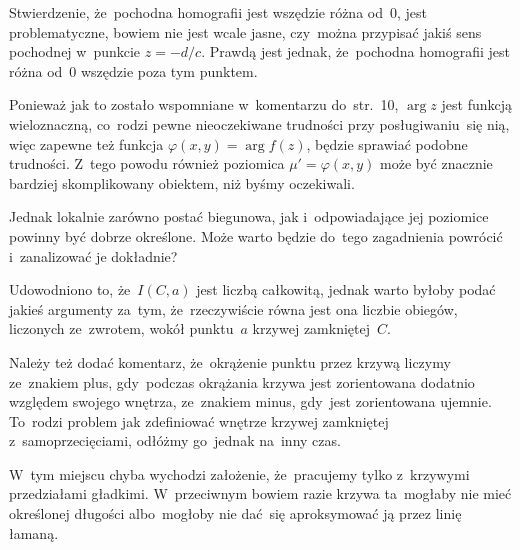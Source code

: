 \documentclass[a4paper,11pt]{article}
\begin{document}
\vspace{\spaceFour}





\noindent
{} Stwierdzenie, że~pochodna homografii jest wszędzie różna od~0,
jest problematyczne, bowiem nie jest wcale jasne, czy~można przypisać
jakiś sens pochodnej w~punkcie $z = -d / c$. Prawdą jest jednak,
że~pochodna homografii jest różna od~0 wszędzie poza tym punktem.

\vspace{\spaceFour}





\noindent
{} Ponieważ jak to zostało wspomniane w~komentarzu do~str.~10,
$\arg z$ jest funkcją wieloznaczną, co~rodzi pewne nieoczekiwane trudności
przy posługiwaniu~się nią, więc zapewne też funkcja
$\varphi( x, y ) = \arg f( z )$, będzie sprawiać podobne trudności. Z~tego powodu
również poziomica $\mu' = \varphi( x, y )$ może być znacznie bardziej skomplikowany
obiektem, niż byśmy oczekiwali.

Jednak lokalnie zarówno postać biegunowa, jak i~odpowiadające jej
poziomice powinny być dobrze określone. Może warto będzie do~tego
zagadnienia powrócić i~zanalizować je dokładnie?

\vspace{\spaceFour}





\noindent
{} Udowodniono to, że~$I( C, a )$ jest liczbą całkowitą, jednak
warto byłoby podać jakieś argumenty za~tym, że~rzeczywiście równa jest ona
liczbie obiegów, liczonych ze~zwrotem, wokół punktu~$a$ krzywej
zamkniętej~$C$.

Należy też dodać komentarz, że~okrążenie punktu przez krzywą liczymy
ze~znakiem plus, gdy~podczas okrążania krzywa jest zorientowana
dodatnio względem swojego wnętrza, ze~znakiem minus, gdy~jest
zorientowana ujemnie. To~rodzi problem jak zdefiniować wnętrze
krzywej zamkniętej z~samoprzecięciami, odłóżmy go~jednak na~inny czas.

\vspace{\spaceFour}





\noindent
{} W~tym miejscu chyba wychodzi założenie, że~pracujemy tylko
z~krzywymi przedziałami gładkimi. W~przeciwnym bowiem razie krzywa
ta~mogłaby nie mieć określonej długości albo~mogłoby nie dać~się
aproksymować ją przez linię łamaną.
\end{document}
